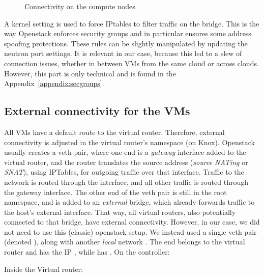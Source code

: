 
\begin{figure}[ht]%
  \centering
  
  \caption{Connectivity on the compute nodes}
  \label{figure:connectivity:compute:nodes}
\end{figure}

A kernel setting is used to force IPtables to filter traffic on the
bridge. This is the way Openstack enforces security groups and in
particular ensures some address spoofing protections. These rules can
be slightly manipulated by updating the neutron port settings.
%
It is relevant in our case, because this led to a slew of connection
issues, whether in between VMs from the same cloud or across
clouds. However, this part is only technical and is found in the
Appendix~\ref{appendix:secgroups}.


\subsection{External connectivity for the VMs}
\label{section:implementation:external:connectivity}

All VMs have a default route to the virtual router. Therefore,
external connectivity is adjusted in the virtual router's namespace
(on Knox).
%
Openstack usually creates a veth pair, where one end is a
\emph{gateway} interface added to the virtual router, and the router
translates the source address (\emph{source NATing} or \emph{SNAT}),
using IPTables, for outgoing traffic over that interface. Traffic to
the  network is routed through the
 interface, and all other traffic is routed through
the gateway interface.
%
The other end of the veth pair is still in the root namespace, and is
added to an \emph{external} bridge, which already forwards traffic to
the host's external interface. That way, all virtual routers, also
potentially connected to that bridge, have external connectivity.
%
However, in our case, we did not need to use this (classic) openstack
setup. We instead used a single veth pair (denoted
), along with another \emph{local} network
. The  end belongs to the virtual router
and has the IP , while  has .
%
On the controller:


Inside the Virtual router:



